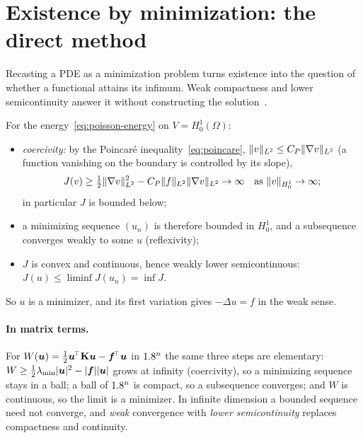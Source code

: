 \section{Existence by minimization: the direct method}\label{sec:var-direct}
%
Recasting a PDE as a minimization problem turns existence into the question
of whether a functional attains its infimum. Weak compactness and lower
semicontinuity answer it without constructing the solution~\cite{Dacorogna2008}.
\begin{center}
\end{center}
For the energy~\eqref{eq:poisson-energy} on $V=H^1_0(\Omega)$:
\begin{itemize}
  \item \emph{coercivity:} by the Poincar\'e inequality~\eqref{eq:poincare},
  $\lVert v\rVert_{L^2}\le C_P\lVert \nabla v\rVert_{L^2}$ (a function vanishing on the
  boundary is controlled by its slope),
  \[
    J(v)\ge\tfrac12\lVert \nabla v\rVert_{L^2}^2-C_P\lVert f\rVert_{L^2}\lVert \nabla v\rVert_{L^2}\to\infty
    \quad\text{as }\lVert v\rVert_{H^1_0}\to\infty;
  \]
  in particular $J$ is bounded below;
  \item a minimizing sequence $(u_n)$ is therefore bounded in $H^1_0$, and a
  subsequence converges weakly to some $u$ (reflexivity);
  \item $J$ is convex and continuous, hence weakly lower semicontinuous:
  $J(u)\le\liminf J(u_n)=\inf J$.
\end{itemize}
So $u$ is a minimizer, and its first variation gives $-\Delta u=f$ in the weak
sense.

\paragraph{In matrix terms.} For $W(\bm{u})=\tfrac12\bm{u}^{\!\top}\mathbf{K}\bm{u}-\bm{f}^{\!\top}\bm{u}$ in
$1.8^n$ the same three steps are elementary: $W\ge\tfrac12\lambda_{\min}|\bm{u}|^2-|\bm{f}||\bm{u}|$
grows at infinity (coercivity), so a minimizing sequence stays in a ball;
a ball of $1.8^n$ is compact, so a subsequence converges; and $W$ is
continuous, so the limit is a minimizer. In infinite dimension a bounded
sequence need not converge, and \emph{weak} convergence with \emph{lower
semicontinuity} replaces compactness and continuity.

